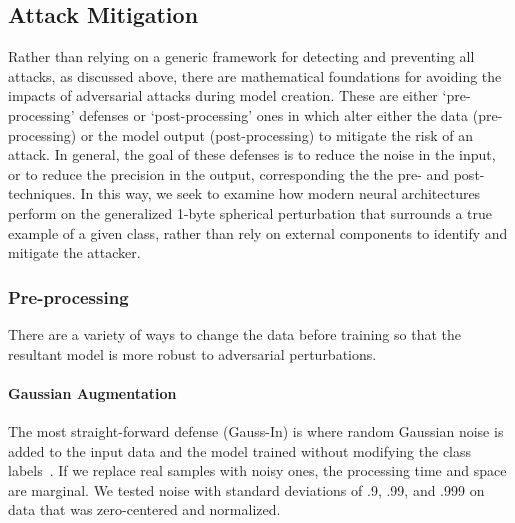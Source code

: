 \documentclass[lettersize,journal]{IEEEtran}
\begin{document}
\subsection{Attack Mitigation}

Rather than relying on a generic framework for detecting and preventing all attacks, as discussed above, there are mathematical foundations for avoiding the impacts of adversarial attacks during model creation. These are either `pre-processing' defenses or `post-processing' ones in which alter either the data (pre-processing) or the model output (post-processing) to mitigate the risk of an attack. In general, the goal of these defenses is to reduce the noise in the input, or to reduce the precision in the output, corresponding the the pre- and post- techniques. In this way, we seek to examine how modern neural architectures perform on the generalized 1-byte spherical perturbation that surrounds a true example of a given class, rather than rely on external components to identify and mitigate the attacker.



\subsubsection{Pre-processing}
\label{pre-processing}
There are a variety of ways to change the data before training so that the resultant model is more robust to adversarial perturbations.


\paragraph{Gaussian Augmentation}
The most straight-forward defense (Gauss-In) is where random Gaussian noise is added to the input data and the model trained without modifying the class labels~\cite{gauss_aug}. If we replace real samples with noisy ones, the processing time and space are marginal. We tested noise with standard deviations of .9, .99, and .999 on data that was zero-centered and normalized.
\end{document}
